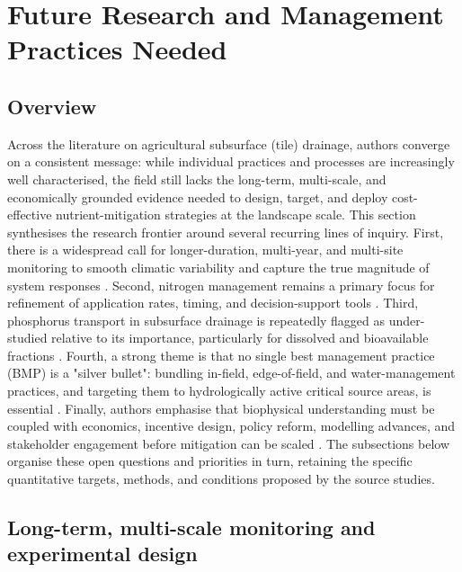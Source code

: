 \documentclass[11pt]{article}
\begin{document}
\section*{Future Research and Management Practices Needed}

\subsection{Overview}

Across the literature on agricultural subsurface (tile) drainage, authors converge on a consistent message: while individual practices and processes are increasingly well characterised, the field still lacks the long-term, multi-scale, and economically grounded evidence needed to design, target, and deploy cost-effective nutrient-mitigation strategies at the landscape scale. This section synthesises the research frontier around several recurring lines of inquiry. First, there is a widespread call for longer-duration, multi-year, and multi-site monitoring to smooth climatic variability and capture the true magnitude of system responses \parencite{Randall2003,Randall2005,Waring2024,Jeong2018,Cooke2012}. Second, nitrogen management remains a primary focus for refinement of application rates, timing, and decision-support tools \parencite{Christianson2015b,Bandura2025,Liu2021}. Third, phosphorus transport in subsurface drainage is repeatedly flagged as under-studied relative to its importance, particularly for dissolved and bioavailable fractions \parencite{Hertzberger2019,Yuan2022,deOliveira2022}. Fourth, a strong theme is that no single best management practice (BMP) is a "silver bullet": bundling in-field, edge-of-field, and water-management practices, and targeting them to hydrologically active critical source areas, is essential \parencite{Sunohara2016,Lenhart2016,Christianson2014,Baulch2019}. Finally, authors emphasise that biophysical understanding must be coupled with economics, incentive design, policy reform, modelling advances, and stakeholder engagement before mitigation can be scaled \parencite{Liu2021,Kvítek2023,David2015}. The subsections below organise these open questions and priorities in turn, retaining the specific quantitative targets, methods, and conditions proposed by the source studies.

\subsection{Long-term, multi-scale monitoring and experimental design}
\end{document}
